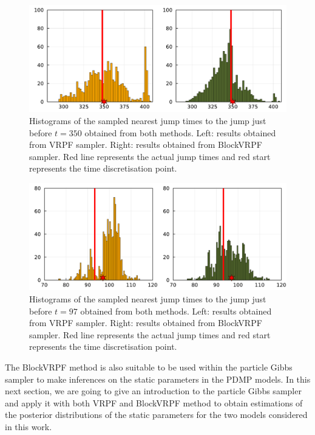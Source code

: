 \documentclass[12pt,a4paper]{article}
\begin{document}
\begin{figure}
    \centering
    \includegraphics[width=\textwidth]{Histogram_NearestJump9.pdf}
    \caption{Histograms of the sampled nearest jump times to the jump just before \(t=350\) obtained from both methods. Left: results obtained from VRPF sampler. Right: results obtained from BlockVRPF sampler. Red line represents the actual jump times and red start represents the time discretisation point.}
    \label{Figure: PF simulation result 2}
\end{figure}

\begin{figure}
    \centering
    \includegraphics[width=\textwidth]{Histogram_NearestJump3.pdf}
    \caption{Histograms of the sampled nearest jump times to the jump just before \(t=97\) obtained from both methods. Left: results obtained from VRPF sampler. Right: results obtained from BlockVRPF sampler. Red line represents the actual jump times and red start represents the time discretisation point.}
    \label{Figure: PF simulation result 3}
\end{figure}

The BlockVRPF method is also suitable to be used within the particle Gibbs sampler to make inferences on the static parameters in the PDMP models. In this next section, we are going to give an introduction to the particle Gibbs sampler and apply it with both VRPF and BlockVRPF method to obtain estimations of the posterior distributions of the static parameters for the two models considered in this work. 
\end{document}
